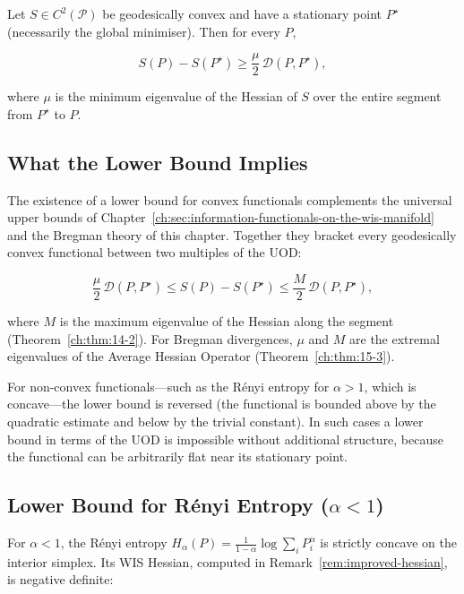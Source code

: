 \begin{theorem}
\label{ch:thm:lower-global}
Let $S\in C^2(\mathcal P)$ be geodesically convex and have a stationary
point $P^\star$ (necessarily the global minimiser).  Then for every $P$,

\[
S(P) - S(P^\star) \ge \frac{\mu}{2}\,\mathcal D(P,P^\star),
\]

where $\mu$ is the minimum eigenvalue of the Hessian of $S$ over the
entire segment from $P^\star$ to $P$.
\end{theorem}

\subsection{What the Lower Bound Implies}\label{ch:sec:what-the-lower-bound-implies}

The existence of a lower bound for convex functionals complements the
universal upper bounds of Chapter~\ref{ch:sec:information-functionals-on-the-wis-manifold} and the Bregman theory of this
chapter.  Together they bracket every geodesically convex functional
between two multiples of the UOD:

\[
\frac{\mu}{2}\,\mathcal D(P,P^\star)
\le
S(P) - S(P^\star)
\le
\frac{M}{2}\,\mathcal D(P,P^\star),
\]

where $M$ is the maximum eigenvalue of the Hessian along the segment
(Theorem~\ref{ch:thm:14-2}).  For Bregman divergences, $\mu$ and $M$
are the extremal eigenvalues of the Average Hessian Operator
(Theorem~\ref{ch:thm:15-3}).

For non-convex functionals---such as the R\'enyi entropy for
$\alpha>1$, which is concave---the lower bound is reversed (the
functional is bounded above by the quadratic estimate and below by the
trivial constant).  In such cases a lower bound in terms of the UOD is
impossible without additional structure, because the functional can be
arbitrarily flat near its stationary point.

\subsection{Lower Bound for R\'enyi Entropy ($\alpha<1$)}\label{ch:sec:lower-bound-for-renyi-entropy}

For $\alpha<1$, the R\'enyi entropy
$H_\alpha(P)=\frac1{1-\alpha}\log\sum_i P_i^\alpha$ is strictly
concave on the interior simplex.  Its WIS Hessian, computed in
Remark~\ref{rem:improved-hessian}, is negative definite:

